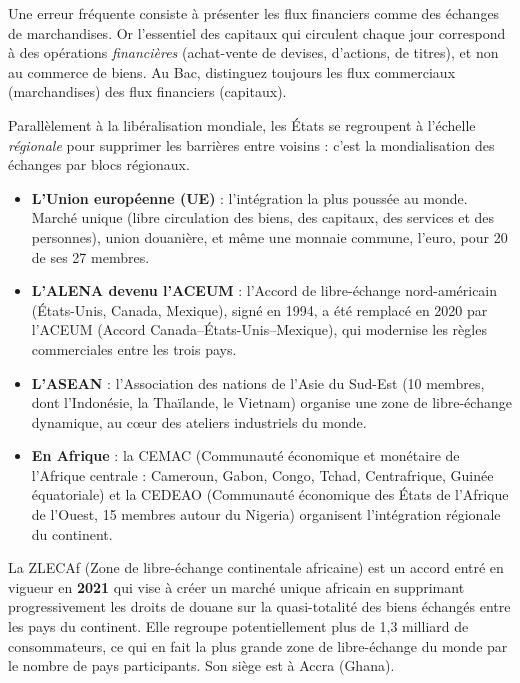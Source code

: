 \documentclass[11pt]{article}
\newcommand{\cle}[1]{{\popxbold\color{popdark}#1}}
\newcounter{popsec}
\newcounter{popsub}
\newcommand{\courssub}[1]{%
  \stepcounter{popsub}%
  \par\vspace{9pt}\noindent{\popxbold\fontsize{11.5}{13}\selectfont\color{popink}{\color{poporange}\thepopsec.\thepopsub}\hspace{6pt}#1}\par\nopagebreak\vspace{4pt}
}
\begin{document}
\begin{attention}
Une erreur fréquente consiste à présenter les flux financiers comme des échanges de marchandises. Or l'essentiel des capitaux qui circulent chaque jour correspond à des opérations \emph{financières} (achat-vente de devises, d'actions, de titres), et non au commerce de biens. Au Bac, distinguez toujours les \cle{flux commerciaux} (marchandises) des \cle{flux financiers} (capitaux).
\end{attention}

\courssub{Les organisations régionales intégrées}

Parallèlement à la libéralisation mondiale, les États se regroupent à l'échelle \emph{régionale} pour supprimer les barrières entre voisins : c'est la \cle{mondialisation des échanges par blocs régionaux}.

\begin{itemize}
\item \textbf{L'Union européenne (UE)} : l'intégration la plus poussée au monde. Marché unique (libre circulation des biens, des capitaux, des services et des personnes), union douanière, et même une monnaie commune, l'euro, pour 20 de ses 27 membres.
\item \textbf{L'ALENA devenu l'ACEUM} : l'Accord de libre-échange nord-américain (États-Unis, Canada, Mexique), signé en 1994, a été remplacé en 2020 par l'ACEUM (Accord Canada--États-Unis--Mexique), qui modernise les règles commerciales entre les trois pays.
\item \textbf{L'ASEAN} : l'Association des nations de l'Asie du Sud-Est (10 membres, dont l'Indonésie, la Thaïlande, le Vietnam) organise une zone de libre-échange dynamique, au cœur des ateliers industriels du monde.
\item \textbf{En Afrique} : la \cle{CEMAC} (Communauté économique et monétaire de l'Afrique centrale : Cameroun, Gabon, Congo, Tchad, Centrafrique, Guinée équatoriale) et la \cle{CEDEAO} (Communauté économique des États de l'Afrique de l'Ouest, 15 membres autour du Nigeria) organisent l'intégration régionale du continent.
\end{itemize}

\begin{definition}[La ZLECAf]
La \cle{ZLECAf} (Zone de libre-échange continentale africaine) est un accord entré en vigueur en \textbf{2021} qui vise à créer un marché unique africain en supprimant progressivement les droits de douane sur la quasi-totalité des biens échangés entre les pays du continent. Elle regroupe potentiellement plus de 1,3 milliard de consommateurs, ce qui en fait la plus grande zone de libre-échange du monde par le nombre de pays participants. Son siège est à Accra (Ghana).
\end{definition}
\end{document}
